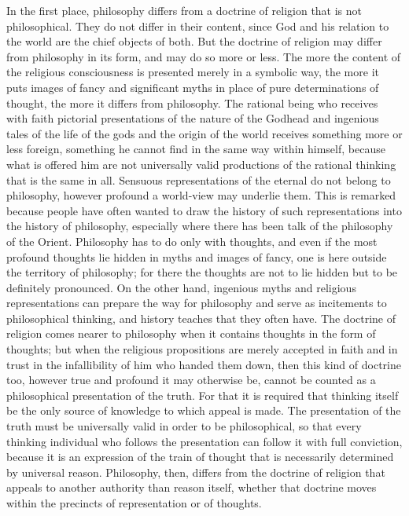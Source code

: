 \documentclass[12pt]{article}
\newcommand{\opage}[1]{\marginnote{\footnotesize\textit{[#1]}}}
\begin{document}
In the first place, philosophy differs from a doctrine of religion that is not philosophical. They do not differ in their content, since God and his relation to the world are the chief objects of both. But the doctrine of religion may differ from philosophy in its form, and may do so more or less. The more the content of the religious consciousness is presented merely in a symbolic way, the more it puts images of fancy and significant myths in place of pure determinations of thought, the more it differs from philosophy. The rational being who receives with faith pictorial presentations of the nature of the Godhead and ingenious tales of the life of the gods and the origin of the world receives something more or less foreign, something he cannot find in the same way within himself, because what is offered him are not universally valid productions of the rational thinking that is the same in all. Sensuous representations of the eternal do not belong to philosophy, however profound a world-view may underlie them. This is remarked because people have often wanted to draw the history of such representations into the history of philosophy, especially where there has been talk\opage{2v} of the philosophy of the Orient. Philosophy has to do only with thoughts, and even if the most profound thoughts lie hidden in myths and images of fancy, one is here outside the territory of philosophy; for there the thoughts are not to lie hidden but to be definitely pronounced. On the other hand, ingenious myths and religious representations can prepare the way for philosophy and serve as incitements to philosophical thinking, and history teaches that they often have. The doctrine of religion comes nearer to philosophy when it contains thoughts in the form of thoughts; but when the religious propositions are merely accepted in faith and in trust in the infallibility of him who handed them down, then this kind of doctrine too, however true and profound it may otherwise be, cannot be counted as a philosophical presentation of the truth. For that it is required that thinking itself be the only source of knowledge to which appeal is made. The presentation of the truth must be universally valid in order to be philosophical, so that every thinking individual who follows the presentation can follow it with full conviction, because it is an expression of the train of thought that is necessarily determined by universal reason. Philosophy, then, differs from the doctrine of religion that appeals to another authority than reason itself, whether that doctrine moves within the precincts of representation or of thoughts.
\end{document}
